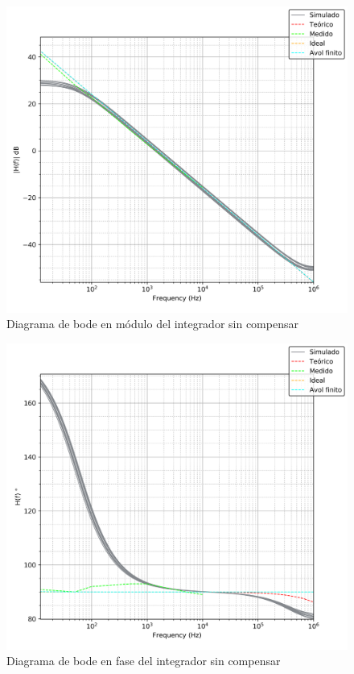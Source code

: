 \begin{figure}[H]
	\centering
	\includegraphics[scale=0.6]{../EJ4/Recursos/Integrador/bode_modulo.png}
	\caption{Diagrama de bode en m\'odulo del integrador sin compensar}
	\label{fig:integrador_bode_modulo}
\end{figure}

\begin{figure}[H]
	\centering
	\includegraphics[scale=0.6]{../EJ4/Recursos/Integrador/bode_fase.png}
	\caption{Diagrama de bode en fase del integrador sin compensar}
	\label{fig:integrador_bode_fase}
\end{figure}

